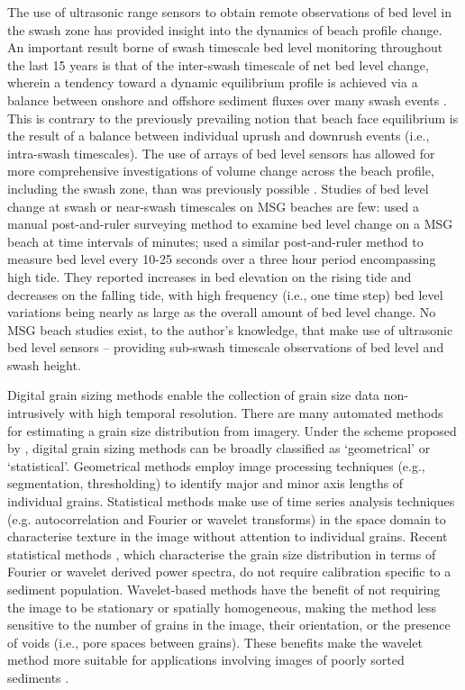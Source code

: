 The use of ultrasonic range sensors to obtain remote observations of bed level in the swash zone has provided insight into the dynamics of beach profile change. An important result borne of swash timescale bed level monitoring throughout the last 15 years is that of the inter-swash timescale of net bed level change, wherein a tendency toward a dynamic equilibrium profile \citep[see][]{Dean1991} is achieved via a balance between onshore and offshore sediment fluxes over many swash events \citep[e.g.,][]{Horn_Walton2004, Turner_etal2008, Masselink_etal2009, Russell_etal2009, Blenkinsopp_etal2011}. This is contrary to the previously prevailing notion that beach face equilibrium is the result of a balance between individual uprush and downrush events (i.e., intra-swash timescales). The use of arrays of bed level sensors has allowed for more comprehensive investigations of volume change across the beach profile, including the swash zone, than was previously possible \citep{Masselink_etal2009, Blenkinsopp_etal2011}. Studies of bed level change at swash or near-swash timescales on MSG beaches are few: \citet{Kulkarni_etal2004} used a manual post-and-ruler surveying method to examine bed level change on a MSG beach at time intervals of minutes; \citet{Horn_Walton2004} used a similar post-and-ruler method to measure bed level every 10-25 seconds over a three hour period encompassing high tide. They reported increases in bed elevation on the rising tide and decreases on the falling tide, with high frequency (i.e., one time step) bed level variations being nearly as large as the overall amount of bed level change. No MSG beach studies exist, to the author's knowledge, that make use of ultrasonic bed level sensors -- providing sub-swash timescale observations of bed level and swash height. 

Digital grain sizing methods enable the collection of grain size data non-intrusively with high temporal resolution. There are many automated methods for estimating a grain size distribution from imagery. Under the scheme proposed by \citet{Buscombe_etal2010}, digital grain sizing methods can be broadly classified as `geometrical' or `statistical'. Geometrical methods \citep[e.g.,][]{Chang_Chung2012} employ image processing techniques (e.g., segmentation, thresholding) to identify major and minor axis lengths of individual grains. Statistical methods \citep[e.g.,][]{Rubin2004, Warrick_etal2009, Buscombe2013} make use of time series analysis techniques (e.g. autocorrelation and Fourier or wavelet transforms) in the space domain to characterise texture in the image without attention to individual grains. Recent statistical methods \citep{Buscombe_etal2010, Buscombe2013}, which characterise the grain size distribution in terms of Fourier or wavelet derived power spectra, do not require calibration specific to a sediment population. Wavelet-based methods have the benefit of not requiring the image to be stationary or spatially homogeneous, making the method less sensitive to the number of grains in the image, their orientation, or the presence of voids (i.e., pore spaces between grains). These benefits make the wavelet method more suitable for applications involving images of poorly sorted sediments \citep{Buscombe2013}.

